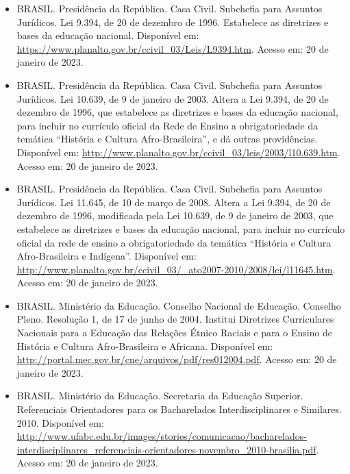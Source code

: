 \begin{itemize}
    
    \item BRASIL. Presidência da República. Casa Civil. Subchefia para Assuntos
    Jurídicos. Lei 9.394, de 20 de dezembro de 1996. Estabelece as diretrizes e
    bases da educação nacional.
    Disponível em: \url{https://www.planalto.gov.br/ccivil_03/Leis/L9394.htm}. 
    Acesso em: 20 de janeiro de 2023.
    
    \item BRASIL. Presidência da República. Casa Civil. Subchefia para Assuntos
    Jurídicos. Lei 10.639, de 9 de janeiro de 2003. Altera a Lei 9.394, de 20
    de dezembro de 1996, que estabelece as diretrizes e bases da educação
    nacional, para incluir no currículo oficial da Rede de Ensino a
    obrigatoriedade da temática ``História e Cultura Afro-Brasileira'', e dá
    outras providências. 
    Disponível em: \url{http://www.planalto.gov.br/ccivil_03/leis/2003/l10.639.htm}.
    Acesso em: 20 de janeiro de 2023.
    
    \item BRASIL. Presidência da República. Casa Civil. Subchefia para Assuntos
    Jurídicos. Lei 11.645, de 10 de março de 2008. Altera a Lei 9.394, de 20 de
    dezembro de 1996, modificada pela Lei 10.639, de 9 de janeiro de 2003, que
    estabelece as diretrizes e bases da educação nacional, para incluir no
    currículo oficial da rede de ensino a obrigatoriedade da temática
    ``História e Cultura Afro-Brasileira e Indígena''. 
    Disponível em: \url{http://www.planalto.gov.br/ccivil_03/_ato2007-2010/2008/lei/l11645.htm}.
    Acesso em: 20 de janeiro de 2023.
    
    \item BRASIL. Ministério da Educação. Conselho Nacional de Educação.
    Conselho Pleno. Resolução 1, de 17 de junho de 2004. Institui Diretrizes
    Curriculares Nacionais para a Educação das Relações Étnico Raciais e para o
    Ensino de História e Cultura Afro-Brasileira e Africana. 
    Disponível em: \url{http://portal.mec.gov.br/cne/arquivos/pdf/res012004.pdf}. 
    Acesso em: 20 de janeiro de 2023.
    
    \item BRASIL. Ministério da Educação. Secretaria da Educação Superior.
    Referenciais Orientadores para os Bacharelados Interdisciplinares e
    Similares. 2010.
    Disponível em: \url{http://www.ufabc.edu.br/images/stories/comunicacao/bacharelados-interdisciplinares_referenciais-orientadores-novembro_2010-brasilia.pdf}.
    Acesso em: 20 de janeiro de 2023.
    

\end{itemize}
